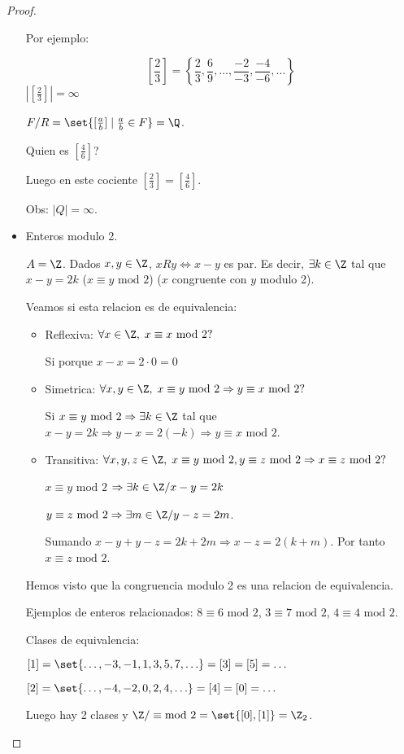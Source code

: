 \begin{proof}
\begin{itemize}
		      Por ejemplo:

		      \[
			      \left [\frac{2}{3}\right ] = \left \{\frac{2}{3}, \frac{6}{9}, \ldots, \frac{-2}{-3}, \frac{-4}{-6}, \ldots \right \}
		      \]
		      \(|[\frac{2}{3}]| = \infty\)

		      \(F/R = \set{[\frac{a}{b}] \mid \frac{a}{b} \in F } = \Q\).

		      Quien es \([\frac{4}{6}]\)?

		      Luego en este cociente \([\frac{2}{3}] = [\frac{4}{6}]\).

		      Obs: \(|Q| = \infty\).

		\item Enteros modulo 2.

		      \(A = \Z \). Dados \(x,y \in \Z \), \(xRy \iff x - y\) es par. Es decir, \(\exists k \in \Z \) tal que \(x - y = 2k\) (\(x \equiv y \text{ mod }  2 \)) (\(x \) congruente con \(y \) modulo 2).

		      Veamos si esta relacion es de equivalencia:
		      \begin{itemize}
			      \item Reflexiva: \(\forall x \in \Z,\; x\equiv x \text{ mod } 2?\)

			            Si porque \(x - x = 2 \cdot 0 = 0 \)
			      \item Simetrica: \(\forall x,y \in \Z, \; x \equiv y \text{ mod } 2 \Rightarrow y \equiv x \text{ mod } 2?\)

			            Si \(x\equiv y \text{ mod } 2 \Rightarrow \exists k \in \Z\) tal que \(x - y = 2k \Rightarrow y - x = 2(-k) \Rightarrow y \equiv x \text{ mod } 2\).
			      \item Transitiva: \(\forall x,y,z \in \Z, \; x \equiv y \text{ mod } 2, y \equiv z \text{ mod } 2	 \Rightarrow x \equiv z \text{ mod } 2?\)

			            \(x \equiv y \text{ mod } 2\) \(\Rightarrow \exists k \in \Z / x - y = 2k \)

			            \(y \equiv z \text{ mod } 2 \Rightarrow \exists m \in \Z / y - z = 2m \).

			            Sumando \( x - y + y - z = 2k + 2m \Rightarrow x - z = 2(k+m )\). Por tanto \(x \equiv z \text{ mod } 2 \).
		      \end{itemize}
		      Hemos visto que la congruencia modulo 2 es una relacion de equivalencia.

		      Ejemplos de enteros relacionados: \(8 \equiv 6 \text{ mod 2}\), \(3 \equiv 7 \text{ mod } 2\), \(4 \equiv 4 \text{ mod } 2 \).

		      Clases de equivalencia:

		      \([1] = \set{\ldots,-3,-1,1,3,5,7,\ldots} = [3] = [5] = \ldots \)

		      \([2] = \set{\ldots,-4,-2,0,2,4,\ldots } = [4] = [0] = \ldots\)

		      Luego hay 2 clases y \(\Z / \equiv \text{mod } 2 = \set{[0], [1]} = \Z_2\).
	\end{itemize}
\end{proof}

